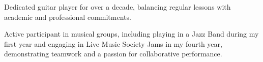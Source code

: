 

\begin{cventries}
  \cventry
    {} %
    {} %
    {} %
    {} %
    {
      \begin{cvitems} %
        \item {Dedicated guitar player for over a decade, balancing regular lessons with academic and professional commitments.}
        \item {Active participant in musical groups, including playing in a Jazz Band during my first year and engaging in Live Music Society Jams in my fourth year, demonstrating teamwork and a passion for collaborative performance.}
      \end{cvitems}
    }


\end{cventries}





